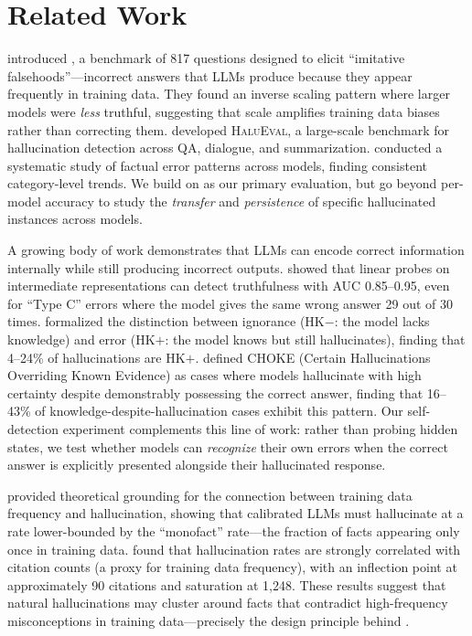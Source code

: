 \section{Related Work}
\label{sec:related}

\citet{lin2022truthfulqa} introduced \truthfulqa, a benchmark of 817 questions designed to elicit ``imitative falsehoods''---incorrect answers that LLMs produce because they appear frequently in training data.
They found an inverse scaling pattern where larger models were \emph{less} truthful, suggesting that scale amplifies training data biases rather than correcting them.
\citet{li2023halueval} developed \textsc{HaluEval}, a large-scale benchmark for hallucination detection across QA, dialogue, and summarization.
\citet{gekhman2024earth} conducted a systematic study of factual error patterns across models, finding consistent category-level trends.
We build on \truthfulqa as our primary evaluation, but go beyond per-model accuracy to study the \emph{transfer} and \emph{persistence} of specific hallucinated instances across models.

A growing body of work demonstrates that LLMs can encode correct information internally while still producing incorrect outputs.
\citet{orgad2024llmsknow} showed that linear probes on intermediate representations can detect truthfulness with AUC 0.85--0.95, even for ``Type C'' errors where the model gives the same wrong answer 29 out of 30 times.
\citet{simhi2024distinguishing} formalized the distinction between ignorance (HK$-$: the model lacks knowledge) and error (HK$+$: the model knows but still hallucinates), finding that 4--24\% of hallucinations are HK$+$.
\citet{simhi2025choke} defined CHOKE (Certain Hallucinations Overriding Known Evidence) as cases where models hallucinate with high certainty despite demonstrably possessing the correct answer, finding that 16--43\% of knowledge-despite-hallucination cases exhibit this pattern.
Our self-detection experiment complements this line of work: rather than probing hidden states, we test whether models can \emph{recognize} their own errors when the correct answer is explicitly presented alongside their hallucinated response.

\citet{miao2025hallucination} provided theoretical grounding for the connection between training data frequency and hallucination, showing that calibrated LLMs must hallucinate at a rate lower-bounded by the ``monofact'' rate---the fraction of facts appearing only once in training data.
\citet{niimi2025hallucinate} found that hallucination rates are strongly correlated with citation counts (a proxy for training data frequency), with an inflection point at approximately 90 citations and saturation at 1,248.
These results suggest that natural hallucinations may cluster around facts that contradict high-frequency misconceptions in training data---precisely the design principle behind \truthfulqa.


